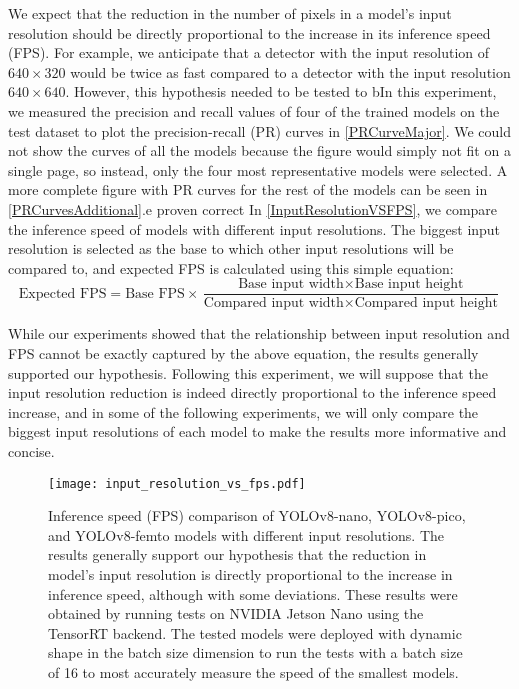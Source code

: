 We expect that the reduction in the number of pixels in a model's input resolution
should be directly proportional to the increase in its inference speed (FPS).
For example, we anticipate that a detector with the input resolution of $640 \times
320$ would be twice as fast compared to a detector with the input resolution $640
\times 640$. However, this hypothesis needed to be tested to bIn this experiment, we measured the precision and recall values of four of the
trained models on the test dataset to plot the precision-recall (PR) curves in
\autoref{PRCurveMajor}. We could not show the curves of all the models because
the figure would simply not fit on a single page, so instead, only the four most
representative models were selected. A more complete figure with PR curves for
the rest of the models can be seen in \autoref{PRCurvesAdditional}.e proven correct
In \autoref{InputResolutionVSFPS}, we compare the inference speed of models with
different input resolutions. The biggest input resolution is selected as the base to which
other input resolutions will be compared to, and expected FPS is calculated using
this simple equation:
\begin{equation}
    \text{Expected FPS} = \text{Base FPS} \times \frac{\text{Base input width} \times \text{Base input height}}{\text{Compared input width} \times \text{Compared input height}}
\end{equation}

While our experiments showed that the relationship between input resolution and FPS
cannot be exactly captured by the above equation, the results generally
supported our hypothesis. Following this experiment, we will suppose that the
input resolution reduction is indeed directly proportional to the inference speed
increase, and in some of the following experiments, we will only compare the
biggest input resolutions of each model to make the results more informative and
concise.

\begin{figure}[t]
    \begin{framed}
        \centering
        \texttt{[image: input\_resolution\_vs\_fps.pdf]}
        \caption{Inference speed (FPS) comparison of YOLOv8-nano, YOLOv8-pico, and
        YOLOv8-femto models with different input resolutions. The results generally
        support our hypothesis that the reduction in model's input resolution is directly
        proportional to the increase in inference speed, although with some
        deviations. These results were obtained by running tests on NVIDIA Jetson
        Nano using the TensorRT backend. The tested models were deployed with
        dynamic shape in the batch size dimension to run the tests with a batch size
        of 16 to most accurately measure the speed of the smallest models.}
        \label{InputResolutionVSFPS}
    \end{framed}
\end{figure}



